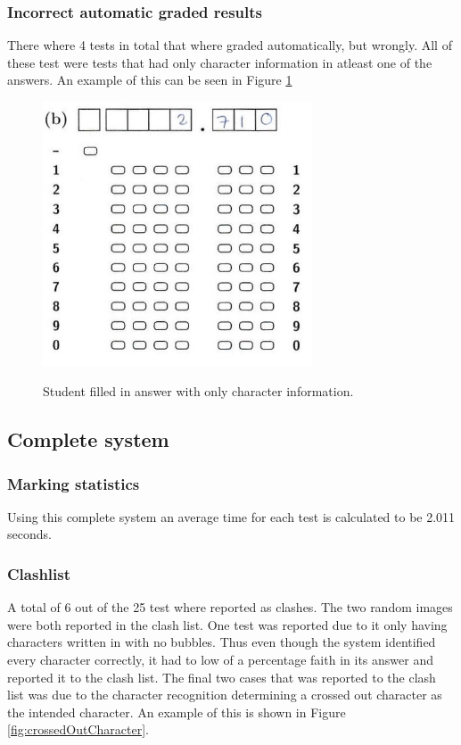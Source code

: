 \subsubsection{Incorrect automatic graded results}

There where 4 tests in total that where graded automatically, but wrongly. All of these test were tests that had only character information in atleast one of the answers. An example of this can be seen in Figure \ref{fig:OnlyCharacters}

\begin{figure}
  \centering
  \includegraphics[width=8cm]{OnlyCharacters}\\
  \caption{Student filled in answer with only character information.}
  \label{fig:OnlyCharacters}
\end{figure}

\subsection{Complete system}

\subsubsection{Marking statistics}

Using this complete system an average time for each test is calculated to be 2.011 seconds. 

\subsubsection{Clashlist}

A total of 6 out of the 25 test where reported as clashes. The two random images were both reported in the clash list. One test was reported due to it only having characters written in with no bubbles. Thus even though the system identified every character correctly, it had to low of a percentage faith in its answer and reported it to the clash list. The final two cases that was reported to the clash list was due to the character recognition determining a crossed out character as the intended character. An example of this is shown in Figure \ref{fig:crossedOutCharacter}.

